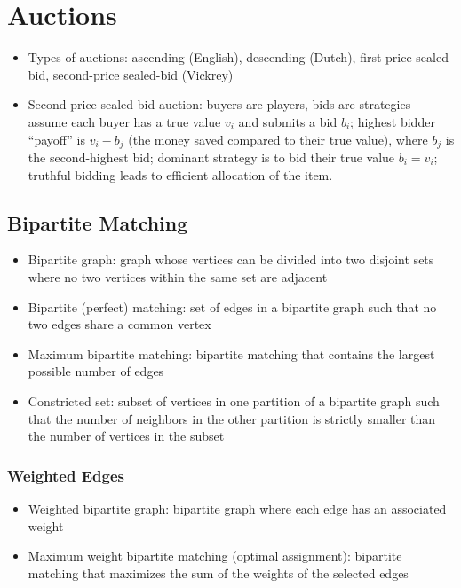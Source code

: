 \chapter{Auctions}

\begin{itemize}
    \item Types of auctions: ascending (English), descending (Dutch), first-price sealed-bid, second-price sealed-bid (Vickrey)
    \item Second-price sealed-bid auction: buyers are players, bids are strategies---assume each buyer has a true value $v_i$ and submits a bid $b_i$; highest bidder ``payoff'' is $v_i - b_j$ (the money saved compared to their true value), where $b_j$ is the second-highest bid; dominant strategy is to bid their true value $b_i = v_i$; truthful bidding leads to efficient allocation of the item.
\end{itemize}

\section{Bipartite Matching}

\begin{itemize}
    \item Bipartite graph: graph whose vertices can be divided into two disjoint sets where no two vertices within the same set are adjacent
    \item Bipartite (perfect) matching: set of edges in a bipartite graph such that no two edges share a common vertex
    \item Maximum bipartite matching: bipartite matching that contains the largest possible number of edges
    \item Constricted set: subset of vertices in one partition of a bipartite graph such that the number of neighbors in the other partition is strictly smaller than the number of vertices in the subset
\end{itemize}

\subsection{Weighted Edges}
\begin{itemize}
    \item Weighted bipartite graph: bipartite graph where each edge has an associated weight
    \item Maximum weight bipartite matching (optimal assignment): bipartite matching that maximizes the sum of the weights of the selected edges
\end{itemize}

